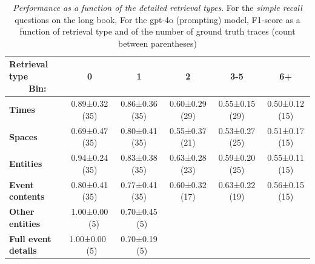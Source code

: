 \documentclass{article}
\begin{document}
\begin{table}[]
\centering
\caption{\textit{Performance as a function of the detailed retrieval types}. For the \emph{simple recall} questions on the long book, For the gpt-4o (prompting) model, F1-score as a function of retrieval type and of the number of ground truth traces (count between parentheses)}
\label{tab:result_retrieval_bin}
\small{
\begin{tabular}{@{}lccccc@{}}
\toprule
\textbf{Retrieval type ~~~~Bin:} & \bf 0 & \bf  1 & \bf 2 & \bf 3-5 & \bf 6+ \\ \midrule
\bf Times & 0.89±0.32 (35) & 0.86±0.36 (35) & 0.60±0.29 (29) & 0.55±0.15 (29) & 0.50±0.12 (15) \\
\bf Spaces & 0.69±0.47 (35) & 0.80±0.41 (35) & 0.55±0.37 (21) & 0.53±0.27 (25) & 0.51±0.17 (15) \\
\bf Entities & 0.94±0.24 (35) & 0.83±0.38 (35) & 0.63±0.28 (23) & 0.59±0.20 (25) & 0.55±0.11 (15) \\
\bf Event contents & 0.80±0.41 (35) & 0.77±0.41 (35) & 0.60±0.32 (17) & 0.63±0.22 (19) & 0.56±0.15 (15) \\
\bf Other entities & 1.00±0.00 ~~(5) & 0.70±0.45 \,~(5) &  &  &  \\
\bf Full event details & 1.00±0.00 \,~(5) & 0.70±0.19 \,~(5) &  &  &  \\ \bottomrule
\end{tabular}
}
\end{table}

 
\end{document}
